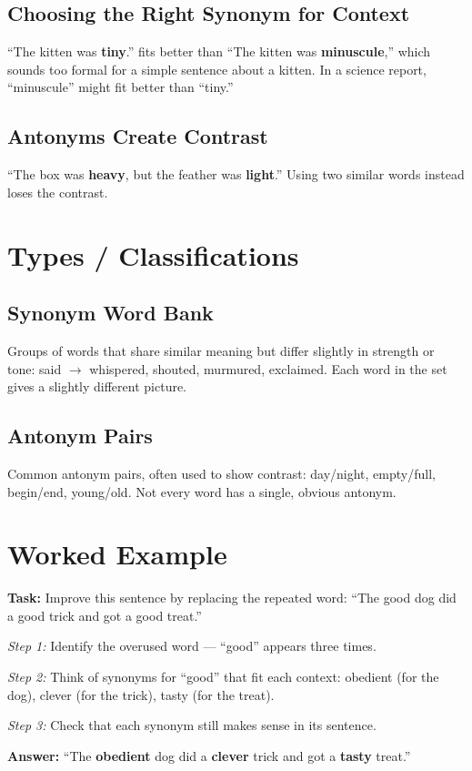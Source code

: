 \subsection*{Choosing the Right Synonym for Context}
``The kitten was \textbf{tiny}.'' fits better than ``The kitten was \textbf{minuscule},'' which sounds too formal for a simple sentence about a kitten. In a science report, ``minuscule'' might fit better than ``tiny.''

\subsection*{Antonyms Create Contrast}
``The box was \textbf{heavy}, but the feather was \textbf{light}.'' Using two similar words instead loses the contrast.

\section{Types / Classifications}

\subsection*{Synonym Word Bank}
Groups of words that share similar meaning but differ slightly in strength or tone: said $\rightarrow$ whispered, shouted, murmured, exclaimed. Each word in the set gives a slightly different picture.

\subsection*{Antonym Pairs}
Common antonym pairs, often used to show contrast: day/night, empty/full, begin/end, young/old. Not every word has a single, obvious antonym.

\section{Worked Example}
\begin{examplebox}
\textbf{Task:} Improve this sentence by replacing the repeated word: ``The good dog did a good trick and got a good treat.''

\textit{Step 1:} Identify the overused word --- ``good'' appears three times.

\textit{Step 2:} Think of synonyms for ``good'' that fit each context: obedient (for the dog), clever (for the trick), tasty (for the treat).

\textit{Step 3:} Check that each synonym still makes sense in its sentence.

\textbf{Answer:} ``The \textbf{obedient} dog did a \textbf{clever} trick and got a \textbf{tasty} treat.''
\end{examplebox}

